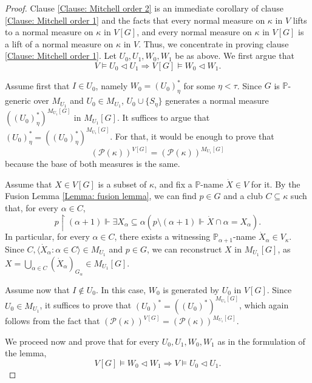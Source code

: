 \documentclass[11pt]{amsart}
\renewcommand{\restriction}{\mathbin\upharpoonright}    %
\theoremstyle{definition}
\theoremstyle{remark}
\newcommand\<{{<}}
\newcommand{\po}{\mathbb{P}}
\newcommand{\la}{\langle}
\newcommand{\ra}{\rangle}
\begin{document}
    \begin{proof}
        Clause \eqref{Clause: Mitchell order 2} is an immediate corollary of clause \eqref{Clause: Mitchell order 1} and the facts that every normal measure on $\kappa$ in $V$ lifts to a normal measure on $\kappa$ in $V[G]$, and every normal measure on $\kappa$ in $V[G]$ is a lift of a normal measure on $\kappa$ in $V$. Thus, we concentrate in proving  clause \eqref{Clause: Mitchell order 1}. Let $U_0, U_1, W_0, W_1$ be as above. We first argue that
        $$ V\vDash U_0 \vartriangleleft U_1 \Longrightarrow  V[G]\vDash W_0 \vartriangleleft W_1. $$
        
        Assume first that $I\in U_0$, namely $W_0 = (U_0)^*_\eta$ for some $\eta<\tau$.  Since $G$ is $\po$-generic over $M_{U_1}$ and $U_0\in M_{U_1}$, $U_0 \cup \{ S_\eta \}$ generates a normal measure $\left( (U_0)^*_\eta \right)^{M_{U_1}[G]}$ in $M_{U_1}[G]$. It suffices to argue that $(U_0)^*_\eta = \left( (U_0)^*_\eta \right)^{M_{U_1}[G]}$. For that, it would be enough to prove that $$\left( \mathcal{P}(\kappa) \right)^{V[G]} = \left( \mathcal{P}(\kappa) \right)^{M_{U_1}[G]}$$
        because the base of both measures is the same.

        Assume that $X\in V[G]$ is a subset of $\kappa$, and fix a $\po$-name $\dot{X}\in V$ for it. By the Fusion Lemma \ref{Lemma: fusion lemma}, we can find $p\in G$ and a club $C\subseteq \kappa$ such that, for every $\alpha\in C$,
        $$p\restriction (\alpha+1) \Vdash \exists X_\alpha\subseteq \alpha \left( p\setminus (\alpha+1) \Vdash \dot{X}\cap \alpha = X_\alpha \right).$$
        In particular, for every $\alpha\in C$, there exists a witnessing $\po_{\alpha+1}$-name $\dot{X}_\alpha\in V_\kappa$. Since $C, \la \dot{X}_\alpha \colon \alpha\in C \ra\in M_{U_1}$ and $p\in G$, we can reconstruct $X$ in $M_{U_1}[G]$, as $X = \bigcup_{\alpha\in C} \left( \dot{X}_\alpha\right)_{G_\alpha}\in M_{U_1}[G]$.

        Assume now that $I\notin U_0$. In this case, $W_0$ is generated by $U_0$ in $V[G]$. Since $U_0\in M_{U_1}$, it suffices to prove that $(U_0)^* = \left( (U_0)^* \right)^{M_{U_1}[G]}$, which again follows from the fact that $\left( \mathcal{P}(\kappa) \right)^{V[G]} = \left( \mathcal{P}(\kappa) \right)^{M_{U_1}[G]}$.

        We proceed now and prove that for every $U_0, U_1, W_0, W_1$ as in the formulation of the lemma, 
        $$  V[G]\vDash W_0 \vartriangleleft W_1 \Longrightarrow V\vDash U_0 \vartriangleleft U_1. $$



\end{proof}
\end{document}
